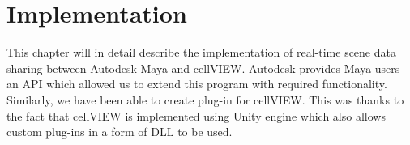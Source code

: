 \documentclass[
  digital, %
  table,   %
  nolof,     %
  nolot,     %
]{fithesis3}
\begin{document}


\chapter{Implementation}
\label{chap:implementation}
This chapter will in detail describe the implementation of real-time scene data sharing between Autodesk Maya and cellVIEW. Autodesk provides Maya users an API which allowed us to extend this program with required functionality. Similarly, we have been able to create plug-in for cellVIEW. This was thanks to the fact that cellVIEW is implemented using Unity engine which also allows custom plug-ins in a form of DLL to be used.
\end{document}
